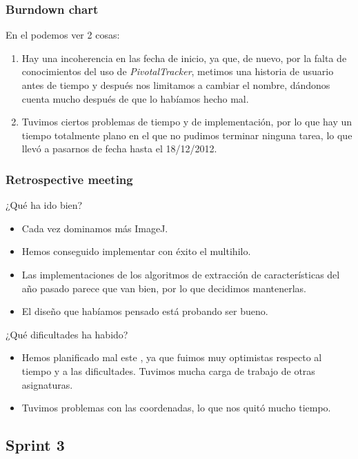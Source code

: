 \subsubsection*{Burndown chart}
En el \burndownchart{}  podemos ver 2 cosas:

\begin{enumerate}
\item Hay una incoherencia en las fecha de inicio, ya que, de nuevo, por la falta de conocimientos del uso de \textit{PivotalTracker}, metimos una historia de usuario antes de tiempo y después nos limitamos a cambiar el nombre, dándonos cuenta mucho después de que lo habíamos hecho mal.
\item Tuvimos ciertos problemas de tiempo y de implementación, por lo que hay un tiempo totalmente plano en el que no pudimos terminar ninguna tarea, lo que llevó a pasarnos de fecha hasta el 18/12/2012.
\end{enumerate}


\subsubsection*{Retrospective meeting}
¿Qué ha ido bien?
\begin{itemize}
 \item Cada vez dominamos más ImageJ.
 \item Hemos conseguido implementar con éxito el multihilo.
 \item Las implementaciones de los algoritmos de extracción de características del año pasado parece que van bien, por lo que decidimos mantenerlas.
 \item El diseño que habíamos pensado está probando ser bueno.
\end{itemize}

¿Qué dificultades ha habido?
\begin{itemize}
 \item Hemos planificado mal este \sprint{}, ya que fuimos muy optimistas respecto al tiempo y a las dificultades. Tuvimos mucha carga de trabajo de otras asignaturas.
 \item Tuvimos problemas con las coordenadas, lo que nos quitó mucho tiempo.
\end{itemize}

\subsection{Sprint 3}
